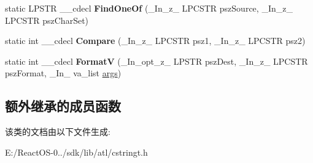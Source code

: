 \begin{DoxyCompactItemize}
static L\+P\+S\+TR \+\_\+\+\_\+cdecl {\bfseries Find\+One\+Of} (\+\_\+\+In\+\_\+z\+\_\+ L\+P\+C\+S\+TR psz\+Source, \+\_\+\+In\+\_\+z\+\_\+ L\+P\+C\+S\+TR psz\+Char\+Set)
\item 
\mbox{\label{class_a_t_l_1_1_ch_traits_c_r_t_3_01char_01_4_aba0b559dbdbf009f5f189721674efac8}} 
static int \+\_\+\+\_\+cdecl {\bfseries Compare} (\+\_\+\+In\+\_\+z\+\_\+ L\+P\+C\+S\+TR psz1, \+\_\+\+In\+\_\+z\+\_\+ L\+P\+C\+S\+TR psz2)
\item 
\mbox{\label{class_a_t_l_1_1_ch_traits_c_r_t_3_01char_01_4_a9911d4d560a0ecded03c2c66519b3e1e}} 
static int \+\_\+\+\_\+cdecl {\bfseries FormatV} (\+\_\+\+In\+\_\+opt\+\_\+z\+\_\+ L\+P\+S\+TR psz\+Dest, \+\_\+\+In\+\_\+z\+\_\+ L\+P\+C\+S\+TR psz\+Format, \+\_\+\+In\+\_\+ va\+\_\+list \hyperlink{structargs}{args})
\end{DoxyCompactItemize}
\subsection*{额外继承的成员函数}


该类的文档由以下文件生成\+:\begin{DoxyCompactItemize}
\item 
E\+:/\+React\+O\+S-\/0../sdk/lib/atl/cstringt.\+h\end{DoxyCompactItemize}
